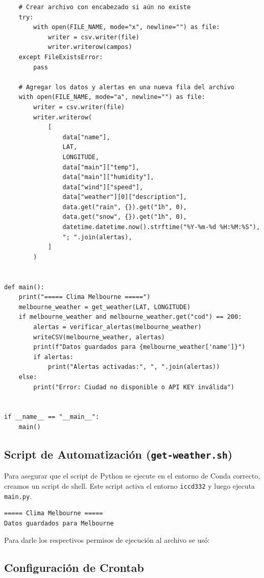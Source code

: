 \documentclass[11pt]{article}
\begin{document}
\begin{verbatim}
    # Crear archivo con encabezado si aún no existe
    try:
        with open(FILE_NAME, mode="x", newline="") as file:
            writer = csv.writer(file)
            writer.writerow(campos)
    except FileExistsError:
        pass

    # Agregar los datos y alertas en una nueva fila del archivo
    with open(FILE_NAME, mode="a", newline="") as file:
        writer = csv.writer(file)
        writer.writerow(
            [
                data["name"],
                LAT,
                LONGITUDE,
                data["main"]["temp"],
                data["main"]["humidity"],
                data["wind"]["speed"],
                data["weather"][0]["description"],
                data.get("rain", {}).get("1h", 0),
                data.get("snow", {}).get("1h", 0),
                datetime.datetime.now().strftime("%Y-%m-%d %H:%M:%S"),
                "; ".join(alertas),
            ]
        )


def main():
    print("===== Clima Melbourne =====")
    melbourne_weather = get_weather(LAT, LONGITUDE)
    if melbourne_weather and melbourne_weather.get("cod") == 200:
        alertas = verificar_alertas(melbourne_weather)
        writeCSV(melbourne_weather, alertas)
        print(f"Datos guardados para {melbourne_weather['name']}")
        if alertas:
            print("Alertas activadas:", ", ".join(alertas))
    else:
        print("Error: Ciudad no disponible o API KEY inválida")


if __name__ == "__main__":
    main()
\end{verbatim}


\subsection{Script de Automatización (\texttt{get-weather.sh})}
\label{sec:org7bf1633}

Para asegurar que el script de Python se ejecute en el entorno de Conda correcto, creamos un script de shell. Este script activa el entorno \texttt{iccd332} y luego ejecuta \texttt{main.py}.

\begin{verbatim}
===== Clima Melbourne =====
Datos guardados para Melbourne
\end{verbatim}



Para darle los respectivos permisos de ejecución al archivo se usó:

\subsection{Configuración de Crontab}
\label{sec:org92608b3}
\end{document}

